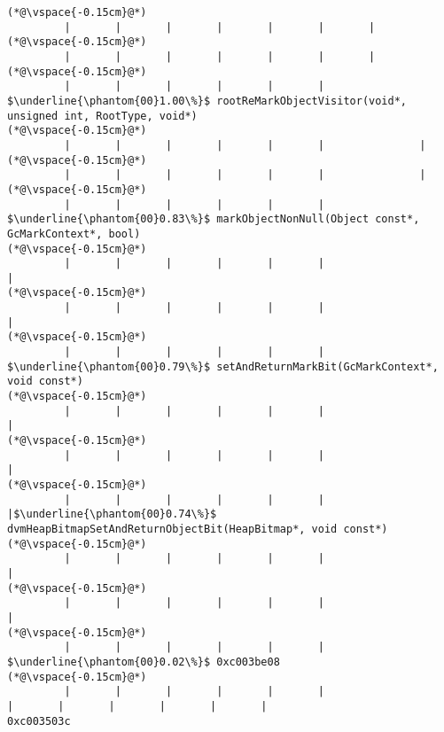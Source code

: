 \begin{lstlisting}[caption=NewDirectByteBuffer, label=profile:C2JNewDirectBuffer-512, numberbychapter=true, frame=lines, float, floatplacement=t]
(*@\vspace{-0.15cm}@*)
         |       |       |       |       |       |       |
(*@\vspace{-0.15cm}@*)
         |       |       |       |       |       |       |
(*@\vspace{-0.15cm}@*)
         |       |       |       |       |       |        $\underline{\phantom{00}1.00\%}$ rootReMarkObjectVisitor(void*, unsigned int, RootType, void*)
(*@\vspace{-0.15cm}@*)
         |       |       |       |       |       |               |
(*@\vspace{-0.15cm}@*)
         |       |       |       |       |       |               |
(*@\vspace{-0.15cm}@*)
         |       |       |       |       |       |                $\underline{\phantom{00}0.83\%}$ markObjectNonNull(Object const*, GcMarkContext*, bool)
(*@\vspace{-0.15cm}@*)
         |       |       |       |       |       |                       |
(*@\vspace{-0.15cm}@*)
         |       |       |       |       |       |                       |
(*@\vspace{-0.15cm}@*)
         |       |       |       |       |       |                        $\underline{\phantom{00}0.79\%}$ setAndReturnMarkBit(GcMarkContext*, void const*)
(*@\vspace{-0.15cm}@*)
         |       |       |       |       |       |                               |
(*@\vspace{-0.15cm}@*)
         |       |       |       |       |       |                               |
(*@\vspace{-0.15cm}@*)
         |       |       |       |       |       |                               |$\underline{\phantom{00}0.74\%}$ dvmHeapBitmapSetAndReturnObjectBit(HeapBitmap*, void const*)
(*@\vspace{-0.15cm}@*)
         |       |       |       |       |       |                               |
(*@\vspace{-0.15cm}@*)
         |       |       |       |       |       |                               |
(*@\vspace{-0.15cm}@*)
         |       |       |       |       |       |                                $\underline{\phantom{00}0.02\%}$ 0xc003be08
(*@\vspace{-0.15cm}@*)
         |       |       |       |       |       |                                        |       |       |       |       |       |                                       0xc003503c

\end{lstlisting}
